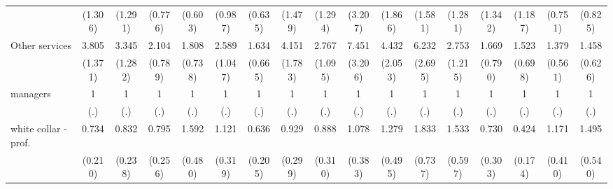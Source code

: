 {\begin{tabular}{l*{16}{c}}
                    &     (1.306)         &     (1.291)         &     (0.776)         &     (0.603)         &     (0.987)         &     (0.635)         &     (1.479)         &     (1.294)         &     (3.207)         &     (1.866)         &     (1.581)         &     (1.281)         &     (1.342)         &     (1.187)         &     (0.751)         &     (0.825)         \\
[1em]
Other services      &       3.805\sym{***}&       3.345\sym{**} &       2.104\sym{*}  &       1.808         &       2.589\sym{*}  &       1.634         &       4.151\sym{***}&       2.767\sym{*}  &       7.451\sym{***}&       4.432\sym{**} &       6.232\sym{***}&       2.753\sym{*}  &       1.669         &       1.523         &       1.379         &       1.458         \\
                    &     (1.371)         &     (1.282)         &     (0.789)         &     (0.738)         &     (1.047)         &     (0.665)         &     (1.783)         &     (1.095)         &     (3.206)         &     (2.053)         &     (2.695)         &     (1.215)         &     (0.790)         &     (0.698)         &     (0.561)         &     (0.626)         \\
[1em]
managers            &           1         &           1         &           1         &           1         &           1         &           1         &           1         &           1         &           1         &           1         &           1         &           1         &           1         &           1         &           1         &           1         \\
                    &         (.)         &         (.)         &         (.)         &         (.)         &         (.)         &         (.)         &         (.)         &         (.)         &         (.)         &         (.)         &         (.)         &         (.)         &         (.)         &         (.)         &         (.)         &         (.)         \\
[1em]
white collar - prof.&       0.734         &       0.832         &       0.795         &       1.592         &       1.121         &       0.636         &       0.929         &       0.888         &       1.078         &       1.279         &       1.833         &       1.533         &       0.730         &       0.424\sym{*}  &       1.171         &       1.495         \\
                    &     (0.210)         &     (0.238)         &     (0.256)         &     (0.480)         &     (0.319)         &     (0.205)         &     (0.299)         &     (0.310)         &     (0.383)         &     (0.495)         &     (0.737)         &     (0.597)         &     (0.303)         &     (0.174)         &     (0.410)         &     (0.540)         \\

\end{tabular}}
